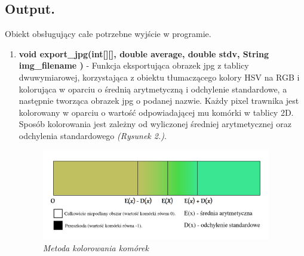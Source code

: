 \documentclass[a4paper]{article}
\begin{document}
\subsection{Output.}
Obiekt obsługujący całe potrzebne wyjście w programie.
\begin{enumerate}
    	\item \textbf{void export\_jpg(int[][], double average, double stdv, String img\_filename )}  - Funkcja eksportująca obrazek jpg z tablicy dwuwymiarowej, korzystająca z obiektu tłumaczącego kolory HSV na RGB i kolorująca w oparciu o średnią arytmetyczną i odchylenie standardowe, a następnie tworząca obrazek jpg o podanej nazwie.
\newline Każdy pixel trawnika jest kolorowany w oparciu o wartość odpowiadającej mu komórki w tablicy 2D. Sposób kolorowania jest zależny od wyliczonej średniej arytmetycznej oraz odchylenia standardowego \textit{(Rysunek 2.)}.

\begin{figure}[H]
    \includegraphics[width=10cm]{kolory.png}
    \centering
    \caption{\textit{Metoda kolorowania komórek}}
\end{figure}


\end{enumerate}
\end{document}
